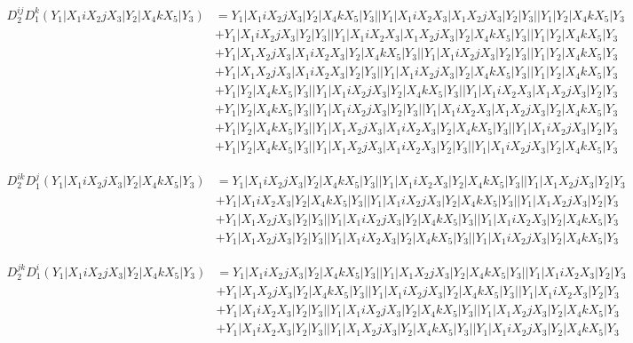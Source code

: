 \documentclass{article}[12pt]
\begin{document}
\begin{align*}
D_2^{ij}D_1^k(Y_1|X_1iX_2jX_3|Y_2|X_4kX_5|Y_3)& =Y_1|X_1iX_2jX_3|Y_2|X_4kX_5|Y_3||Y_1|X_1iX_2X_3|X_1X_2jX_3|Y_2|Y_3||Y_1|Y_2|X_4kX_5|Y_3\\ 
 & +Y_1|X_1iX_2jX_3|Y_2|Y_3||Y_1|X_1iX_2X_3|X_1X_2jX_3|Y_2|X_4kX_5|Y_3||Y_1|Y_2|X_4kX_5|Y_3\\ 
 & +Y_1|X_1X_2jX_3|X_1iX_2X_3|Y_2|X_4kX_5|Y_3||Y_1|X_1iX_2jX_3|Y_2|Y_3||Y_1|Y_2|X_4kX_5|Y_3\\ 
 & +Y_1|X_1X_2jX_3|X_1iX_2X_3|Y_2|Y_3||Y_1|X_1iX_2jX_3|Y_2|X_4kX_5|Y_3||Y_1|Y_2|X_4kX_5|Y_3\\ 
 & +Y_1|Y_2|X_4kX_5|Y_3||Y_1|X_1iX_2jX_3|Y_2|X_4kX_5|Y_3||Y_1|X_1iX_2X_3|X_1X_2jX_3|Y_2|Y_3\\ 
 & +Y_1|Y_2|X_4kX_5|Y_3||Y_1|X_1iX_2jX_3|Y_2|Y_3||Y_1|X_1iX_2X_3|X_1X_2jX_3|Y_2|X_4kX_5|Y_3\\ 
 & +Y_1|Y_2|X_4kX_5|Y_3||Y_1|X_1X_2jX_3|X_1iX_2X_3|Y_2|X_4kX_5|Y_3||Y_1|X_1iX_2jX_3|Y_2|Y_3\\ 
 & +Y_1|Y_2|X_4kX_5|Y_3||Y_1|X_1X_2jX_3|X_1iX_2X_3|Y_2|Y_3||Y_1|X_1iX_2jX_3|Y_2|X_4kX_5|Y_3\end{align*}

\begin{align*}
D_2^{ik}D_1^j(Y_1|X_1iX_2jX_3|Y_2|X_4kX_5|Y_3)& =Y_1|X_1iX_2jX_3|Y_2|X_4kX_5|Y_3||Y_1|X_1iX_2X_3|Y_2|X_4kX_5|Y_3||Y_1|X_1X_2jX_3|Y_2|Y_3\\ 
 & +Y_1|X_1iX_2X_3|Y_2|X_4kX_5|Y_3||Y_1|X_1iX_2jX_3|Y_2|X_4kX_5|Y_3||Y_1|X_1X_2jX_3|Y_2|Y_3\\  
 & +Y_1|X_1X_2jX_3|Y_2|Y_3||Y_1|X_1iX_2jX_3|Y_2|X_4kX_5|Y_3||Y_1|X_1iX_2X_3|Y_2|X_4kX_5|Y_3\\ 
 & +Y_1|X_1X_2jX_3|Y_2|Y_3||Y_1|X_1iX_2X_3|Y_2|X_4kX_5|Y_3||Y_1|X_1iX_2jX_3|Y_2|X_4kX_5|Y_3\end{align*}

\begin{align*}
D_2^{jk}D_1^i(Y_1|X_1iX_2jX_3|Y_2|X_4kX_5|Y_3)& =Y_1|X_1iX_2jX_3|Y_2|X_4kX_5|Y_3||Y_1|X_1X_2jX_3|Y_2|X_4kX_5|Y_3||Y_1|X_1iX_2X_3|Y_2|Y_3\\ 
 & +Y_1|X_1X_2jX_3|Y_2|X_4kX_5|Y_3||Y_1|X_1iX_2jX_3|Y_2|X_4kX_5|Y_3||Y_1|X_1iX_2X_3|Y_2|Y_3\\ 
 & +Y_1|X_1iX_2X_3|Y_2|Y_3||Y_1|X_1iX_2jX_3|Y_2|X_4kX_5|Y_3||Y_1|X_1X_2jX_3|Y_2|X_4kX_5|Y_3\\ 
 & +Y_1|X_1iX_2X_3|Y_2|Y_3||Y_1|X_1X_2jX_3|Y_2|X_4kX_5|Y_3||Y_1|X_1iX_2jX_3|Y_2|X_4kX_5|Y_3\end{align*}
\end{document}

